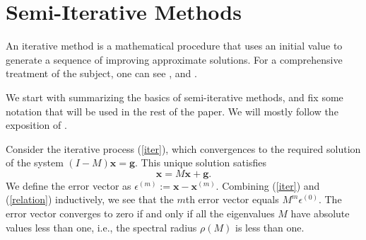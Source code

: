 \documentclass[reqno]{amsart}
\newcommand{\mb}{\mathbf}
\numberwithin{equation}{section}
\theoremstyle{plain}
\theoremstyle{definition}
\begin{document}
\section{Semi-Iterative Methods}
An iterative method is a mathematical procedure that uses an initial value to generate a sequence of improving approximate solutions. For a comprehensive treatment of the subject, one can see \cite{greenbaum}, and \cite{varga}.

We start with summarizing the basics of semi-iterative methods, and fix some notation that will be used in the rest of the paper. We will mostly follow the exposition of \cite{varga}.

Consider the iterative process (\ref{iter}), which convergences to the required solution of the system $(I-M)\mb{x}=\mb{g}$. This unique solution satisfies
\begin{equation}\label{relation}
	\mb{x}=M\mb{x}+\mb{g}.
\end{equation}
We define the error vector as $\epsilon^{(m)}:=\mb{x}-\mb{x}^{(m)}$. Combining (\ref{iter}) and (\ref{relation}) inductively, we see that the $m$th error vector equals $M^m\epsilon^{(0)}$. The error vector converges to zero if and only if all the eigenvalues $M$ have absolute values less than one, i.e., the spectral radius $\rho(M)$ is less than one. 
\end{document}
